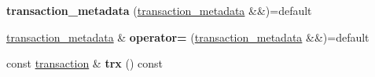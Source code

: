 \begin{DoxyCompactItemize}
{\bfseries transaction\+\_\+metadata} (\mbox{\hyperlink{classaacio_1_1chain_1_1transaction__metadata}{transaction\+\_\+metadata}} \&\&)=default
\item 
\mbox{\label{classaacio_1_1chain_1_1transaction__metadata_aa4b2826f45741390e8034804e4f009ff}} 
\mbox{\hyperlink{classaacio_1_1chain_1_1transaction__metadata}{transaction\+\_\+metadata}} \& {\bfseries operator=} (\mbox{\hyperlink{classaacio_1_1chain_1_1transaction__metadata}{transaction\+\_\+metadata}} \&\&)=default
\item 
\mbox{\label{classaacio_1_1chain_1_1transaction__metadata_a8b7591a64eb26b02163cecabb88db576}} 
const \mbox{\hyperlink{structaacio_1_1chain_1_1transaction}{transaction}} \& {\bfseries trx} () const
\end{DoxyCompactItemize}
